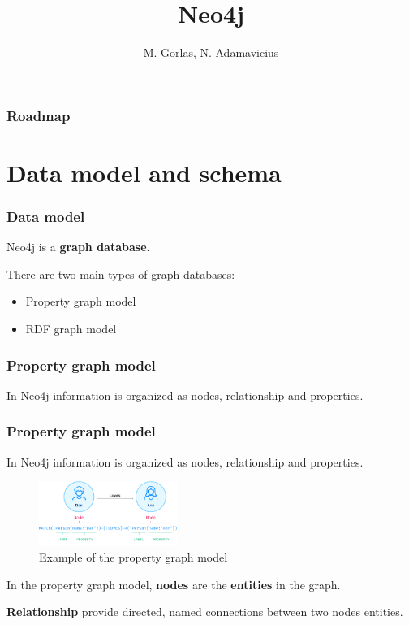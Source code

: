 \documentclass[aspectratio=169]{beamer}
\title{Neo4j}
\institute{FHTenL}
\author{M. Gorlas, N. Adamavicius}
\begin{document}
\begin{titleframe}
    \titlepage
\end{titleframe}

\begin{frame}
    \frametitle{Roadmap}
    \tableofcontents
\end{frame}

\section{Data model and schema}
\begin{frame}
    \frametitle{Data model}
    Neo4j is a \textbf{graph database}.

    There are two main types of graph databases:
    \begin{itemize}
        \item Property graph model
        \item RDF graph model
    \end{itemize}

\end{frame}

\begin{frame}
    \frametitle{Property graph model}
    In Neo4j information is organized as nodes, relationship and properties.
\end{frame}

\begin{frame}
    \frametitle{Property graph model}
    In Neo4j information is organized as nodes, relationship and properties.

    \begin{figure}
        \centering
        \includegraphics[width=0.4\textwidth]{pgmodel.png}
        \caption{Example of the property graph model }
        \label{fig:pgmodel}
    \end{figure}

    In the property graph model, \textbf{nodes} are the \textbf{entities} in the graph.

    \textbf{Relationship} provide directed, named connections between two nodes entities.
\end{frame}
\end{document}
